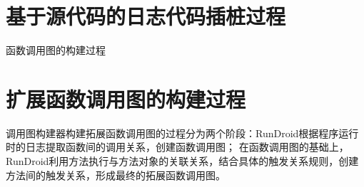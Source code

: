 \section{基于源代码的日志代码插桩过程}


\begin{algorithm}[!ht]
	\caption{函数调用图的构建过程} 
	\label{alg:instrument}
	
	
\end{algorithm}

\section{扩展函数调用图的构建过程}

调用图构建器构建拓展函数调用图的过程分为两个阶段：RunDroid根据程序运行时的日志提取函数间的调用关系，创建函数调用图；
在函数调用图的基础上，RunDroid利用方法执行与方法对象的关联关系，结合具体的触发关系规则，创建方法间的触发关系，形成最终的拓展函数调用图。


